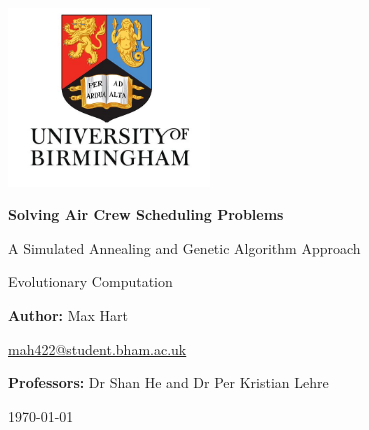 \documentclass[12pt]{article}
\begin{document}
\begin{titlepage}
    \centering
    \vspace*{1cm}
    
    \includegraphics[width=0.4\textwidth]{UoB.jpg}\par\vspace{1cm}
    
    {\LARGE\bfseries Solving Air Crew Scheduling Problems\par}
    \vspace{0.5cm}
    {\Large A Simulated Annealing and Genetic Algorithm Approach\par}
    \vspace{0.75cm}
    
    {\large Evolutionary Computation\par}
    \vspace{1.5cm}
    
    {\large\textbf{Author:} Max Hart\par}
    \vspace{0.3cm}
    {\normalsize \href{mailto:mah422@student.bham.ac.uk}{mah422@student.bham.ac.uk}\par}
    \vspace{1.5cm}
    
    {\large\textbf{Professors:} Dr Shan He and Dr Per Kristian Lehre\par}
    \vspace{1cm}
    
    {\large \today\par}
    
\end{titlepage}

\tableofcontents

\newpage
\end{document}
